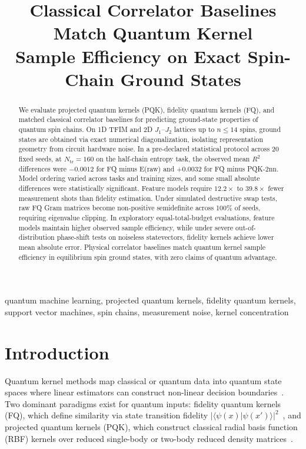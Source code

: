 \documentclass[conference]{IEEEtran}
\begin{document}
\title{Classical Correlator Baselines Match Quantum Kernel\\
Sample Efficiency on Exact Spin-Chain Ground States}

\author{
}

\maketitle

\begin{abstract}
We evaluate projected quantum kernels (PQK), fidelity quantum kernels (FQ),
and matched classical correlator baselines for predicting ground-state
properties of quantum spin chains. On 1D TFIM and 2D $J_1$--$J_2$ lattices
up to $n\le 14$ spins, ground states are obtained via exact numerical
diagonalization, isolating representation geometry from circuit hardware
noise. In a pre-declared statistical protocol across 20 fixed seeds, at $N_{\mathrm{tr}}=160$ on the half-chain entropy task, the observed mean $R^2$ differences were $-0.0012$ for FQ minus E(raw) and $+0.0032$ for FQ minus PQK-2nn. Model ordering varied across tasks and training sizes, and some small absolute differences were statistically significant. Feature models require $12.2\times$ to $39.8\times$ fewer measurement shots than fidelity estimation. Under simulated destructive swap tests, raw FQ Gram matrices
become non-positive semidefinite across 100\% of seeds, requiring eigenvalue
clipping. In exploratory equal-total-budget evaluations, feature models maintain
higher observed sample efficiency, while under severe out-of-distribution
phase-shift tests on noiseless statevectors, fidelity kernels achieve lower mean
absolute error. Physical correlator baselines match quantum kernel sample efficiency
in equilibrium spin ground states, with zero claims of quantum advantage.
\end{abstract}

\begin{IEEEkeywords}
quantum machine learning, projected quantum kernels, fidelity quantum kernels,
support vector machines, spin chains, measurement noise, kernel concentration
\end{IEEEkeywords}

\section{Introduction}
Quantum kernel methods map classical or quantum data into quantum state spaces where linear estimators can construct non-linear decision boundaries~\cite{havlicek2019, schuld2019}. Two dominant paradigms exist for quantum inputs: fidelity quantum kernels (FQ), which define similarity via state transition fidelity $|\langle \psi(x) | \psi(x') \rangle|^2$~\cite{havlicek2019}, and projected quantum kernels (PQK), which construct classical radial basis function (RBF) kernels over reduced single-body or two-body reduced density matrices~\cite{huang2021}.
\end{document}
